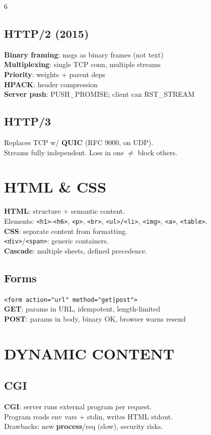 \documentclass[10pt,landscape,letterpaper]{article}
\newcommand{\concept}[1]{\textcolor{conceptcyan}{\textbf{#1}}}
\newcommand{\category}[1]{\textcolor{categorygreen}{\textbf{#1}}}
\begin{document}
\begin{multicols}{6}
\subsection{HTTP/2 (2015)}
\category{Binary framing}: msgs as binary frames (not text)\\
\category{Multiplexing}: single TCP conn, multiple streams\\
\category{Priority}: weights + parent deps\\
\category{HPACK}: header compression\\
\category{Server push}: PUSH\_PROMISE; client can RST\_STREAM

\subsection{HTTP/3}
Replaces TCP w/ \concept{QUIC} (RFC 9000, on UDP).\\
Streams fully independent. Loss in one $\neq$ block others.

\section{HTML \& CSS}
\concept{HTML}: structure + semantic content.\\
Elements: \texttt{<h1>}-\texttt{<h6>}, \texttt{<p>}, \texttt{<br>}, \texttt{<ul>/<li>}, \texttt{<img>}, \texttt{<a>}, \texttt{<table>}.\\
\concept{CSS}: separate content from formatting.\\
\texttt{<div>}/\texttt{<span>}: generic containers.\\
\concept{Cascade}: multiple sheets, defined precedence.

\subsection{Forms}
\texttt{<form action="url" method="get|post">}\\
\category{GET}: params in URL, idempotent, length-limited\\
\category{POST}: params in body, binary OK, browser warns resend

\section{DYNAMIC CONTENT}
\subsection{CGI}
\concept{CGI}: server runs external program per request.\\
Program reads env vars + stdin, writes HTML stdout.\\
Drawbacks: new \textbf{process}/req (slow), security risks.


\end{multicols}
\end{document}
